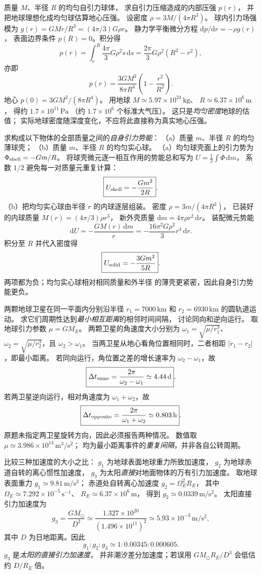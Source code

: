 质量 $M$、半径 $R$ 的均匀自引力球体，
求自引力压缩造成的内部压强 $p(r)$，
并把地球理想化成均匀球估算地心压强。
\exsolution
设密度 $\rho=3M/(4\pi R^3)$。
球内引力场强模为
$g(r)=GM r/R^3=(4\pi/3)G\rho r$。
静力学平衡微分方程
$\mathrm dp/\mathrm dr=-\rho g(r)$，
表面边界条件 $p(R)=0$。积分得
\[
p(r)=\int_r^R\frac{4\pi}{3}G\rho^2s\,\mathrm ds
=\frac{2\pi}{3}G\rho^2(R^2-r^2),
\]
亦即
\[
\boxed{p(r)=\frac{3GM^2}{8\pi R^4}
\left(1-\frac{r^2}{R^2}\right)}.
\]
地心 $p(0)=3GM^2/(8\pi R^4)$。
用地球 $M\simeq5.97\times10^{24}\,\mathrm{kg}$、
$R\simeq6.37\times10^6\,\mathrm m$，
得约 $1.7\times10^{11}\,\mathrm{Pa}$
（约 $1.7\times10^6$ 个标准大气压）。
\excheck 这只是\emph{均匀密度}地球的估值；
实际地球密度随深度变化，不应将此直接称为真实地心压强。

求构成以下物体的全部质量之间的\emph{自身引力势能}：
（a）质量 $m$、半径 $R$ 的均匀薄球壳；
（b）质量 $m$、半径 $R$ 的均匀实心球。
\exsolution
（a）均匀球壳面上的引力势为
$\Phi_{\rm shell}=-Gm/R$。
将球壳微元逐一相互作用的势能总和写为
$U=\tfrac12\int\Phi\,\mathrm dm$，
系数 $1/2$ 避免每一对质量元重复计算：
\[
\boxed{U_{\rm shell}=-\frac{Gm^2}{2R}}.
\]
（b）把均匀实心球由半径 $r$ 的内球逐层组装。
密度 $\rho=3m/(4\pi R^3)$，
已装好的内球质量 $M(r)=(4\pi/3)\rho r^3$，
新外壳质量 $\mathrm dm=4\pi\rho r^2\,\mathrm dr$。
装配微元势能
\[
\mathrm dU=-\frac{GM(r)\,\mathrm dm}{r}
=-\frac{16\pi^2G\rho^2}{3}r^4\,\mathrm dr.
\]
积分至 $R$ 并代入密度得
\[
\boxed{U_{\rm solid}=-\frac{3Gm^2}{5R}}.
\]
\excheck 两项都为负；均匀实心球相对相同质量和外半径
的薄壳更紧密，因此自身引力势能更负。

两颗地球卫星在同一平面内分别沿半径
$r_1=7000\,\mathrm{km}$ 和
$r_2=6930\,\mathrm{km}$ 的圆轨道运动。
求它们周期性达到\emph{最小相互距离}的相邻时间间隔，
讨论同向和逆向运行。
\exsolution
取地球引力参数 $\mu=GM_E$。
两颗卫星的角速度大小分别为
$\omega_1=\sqrt{\mu/r_1^3}$、
$\omega_2=\sqrt{\mu/r_2^3}$，且 $\omega_2>\omega_1$。
当两卫星从地心看角位置相同时，二者相距
$|r_1-r_2|$，即最小距离。
若同向运行，角位置之差的增长速率为
$\omega_2-\omega_1$，故
\[
\boxed{\Delta t_{\rm same}=
\frac{2\pi}{\omega_2-\omega_1}
\simeq4.44\,\mathrm d}.
\]
若两卫星逆向运行，相对角速度为
$\omega_1+\omega_2$，故
\[
\boxed{\Delta t_{\rm opposite}=
\frac{2\pi}{\omega_1+\omega_2}
\simeq0.803\,\mathrm h}.
\]
\excheck 原题未指定两卫星旋转方向，因此必须报告两种情况。
数值取 $\mu\simeq3.986\times10^{14}\,\mathrm{m^3/s^2}$；
均为最小距离事件的\emph{重复间隔}，并非各自公转周期。

比较三种加速度的大小之比：
$g_1$ 为地球表面地球重力所致加速度，
$g_2$ 为地球赤道自转的离心惯性加速度，
$g_3$ 为太阳\emph{直接}对地面物体的万有引力加速度。
\exsolution
取地球表面重力
$g_1\simeq9.81\,\mathrm{m/s^2}$；
赤道处自转离心加速度
$g_2=\Omega_E^2R_E$，
其中 $\Omega_E\simeq7.292\times10^{-5}\,\mathrm{s^{-1}}$、
$R_E\simeq6.37\times10^6\,\mathrm m$，
得到 $g_2\simeq0.0339\,\mathrm{m/s^2}$。
太阳直接引力加速度为
\[
g_3=\frac{GM_\odot}{D^2}
\simeq\frac{1.327\times10^{20}}
{(1.496\times10^{11})^2}
\simeq5.93\times10^{-3}\,\mathrm{m/s^2},
\]
其中 $D$ 为日地距离。因此
\[
\boxed{g_1:g_2:g_3
\simeq1:0.00345:0.000605}.
\]
\excheck $g_3$ 是\emph{太阳的直接引力加速度}，
并非潮汐差分加速度；若误用
$GM_\odot R_E/D^3$ 会低估约 $D/R_E$ 倍。

